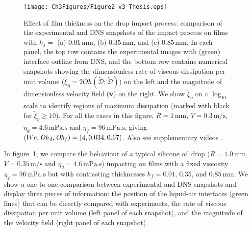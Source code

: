 \begin{figure}
	\centering
	\texttt{[image: Ch3Figures/Figure2\_v3\_Thesis.eps]}
	\caption{Effect of film thickness on the drop impact process: comparison of the experimental and DNS snapshots of the impact process on films with $h_f = $ (a) $0.01\,\si{\milli\meter}$, (b) $0.35\,\si{\milli\meter}$, and (c) $0.85\,\si{\milli\meter}$. In each panel, the top row contains the experimental images with (green) interface outline from DNS, and the bottom row contains numerical snapshots showing the dimensionless rate of viscous dissipation per unit volume ($\tilde{\xi}_\eta = 2Oh\left(\boldsymbol{\tilde{\mathcal{D}}:\tilde{\mathcal{D}}}\right)$) on the left and the magnitude of dimensionless velocity field ($\boldsymbol{\tilde{v}}$) on the right. We show $\tilde{\xi}_\eta$ on a $\log_{\text{10}}$ scale to identify regions of maximum dissipation (marked with black for $\tilde{\xi}_\eta \ge 10$). For all the cases in this figure, $R = 1\,\si{\milli\meter}$, $V = 0.3\,\si{\meter}/\si{\second}$, $\eta_{d} = 4.6\,\si{\milli\pascal}.\si{\second}$ and $\eta_{f} = 96\,\si{\milli\pascal}.\si{\second}$, giving $(We, \mathit{Oh}_\mathit{d}, \mathit{Oh}_\mathit{f}) = (4, 0.034, 0.67)$. Also see supplementary videos~.}
	\label{fig:figure02}
\end{figure}
% 
In figure~\ref{fig:figure02}, we compare the behaviour of a typical silicone oil drop ($R = 1.0\,\si{\milli\meter}$, $V = 0.35\,\si{\meter}/\si{\second}$ and $\eta_d = 4.6\,\si{\milli\pascal}.\si{\second}$) impacting on films with a fixed viscosity $\eta_f = 96\,\si{\milli\pascal}.\si{\second}$ but with contrasting thicknesses $h_{f} = 0.01,\,0.35$, and $0.85\,\si{\milli\meter}$. We show a one-to-one comparison between experimental and DNS snapshots and display three pieces of information: the position of the liquid-air interfaces (green lines) that can be directly compared with experiments, the rate of viscous dissipation per unit volume (left panel of each snapshot), and the magnitude of the velocity field (right panel of each snapshot).

